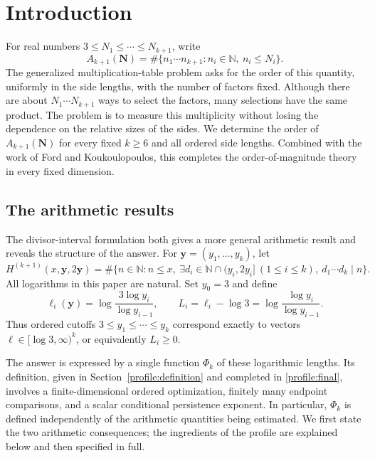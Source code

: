 \section{Introduction}
\label{paper:introduction}

For real numbers $3\leq N_1\leq\cdots\leq N_{k+1}$, write
\[
 A_{k+1}(\mathbf N)
 =\#\{n_1\cdots n_{k+1}: n_i\in\mathbb N,\ n_i\leq N_i\}.
\]
The generalized multiplication-table problem asks for the order of this
quantity, uniformly in the side lengths, with the number of factors fixed.
Although there are about $N_1\cdots N_{k+1}$ ways to select the factors,
many selections have the same product. The problem is to measure this
multiplicity without losing the dependence on the relative sizes of the
sides. We determine the order of $A_{k+1}(\mathbf N)$ for every fixed
$k\geq6$ and all ordered side lengths. Combined with the work of Ford and
Koukoulopoulos, this completes the order-of-magnitude theory in every
fixed dimension.

\subsection{The arithmetic results}

The divisor-interval formulation both gives a more general arithmetic
result and reveals the structure of the answer. For
$\mathbf y=(y_1,\ldots,y_k)$, let
\[
 H^{(k+1)}(x,\mathbf y,2\mathbf y)
 =\#\bigl\{n\in\mathbb N:n\leq x,\
 \exists d_i\in\mathbb N\cap(y_i,2y_i]\ (1\leq i\leq k),\
 d_1\cdots d_k\mid n\bigr\}.
\]
All logarithms in this paper are natural. Set $y_0=3$ and define
\begin{equation}
 \ell_i(\mathbf y)=\log\frac{3\log y_i}{\log y_{i-1}},
 \qquad
 L_i=\ell_i-\log3=\log\frac{\log y_i}{\log y_{i-1}}.
 \label{paper:ell}
\end{equation}
Thus ordered cutoffs $3\leq y_1\leq\cdots\leq y_k$ correspond exactly
to vectors $\ell\in[\log3,\infty)^k$, or equivalently $L_i\geq0$.

The answer is expressed by a single function $\Phi_k$ of these logarithmic
lengths. Its definition, given in Section~\ref{profile:definition} and
completed in \eqref{profile:final}, involves a finite-dimensional ordered
optimization, finitely many endpoint comparisons, and a scalar
conditional persistence exponent. In particular, $\Phi_k$ is defined
independently of the arithmetic quantities being estimated. We first
state the two arithmetic consequences; the ingredients of the profile
are explained below and then specified in full.

